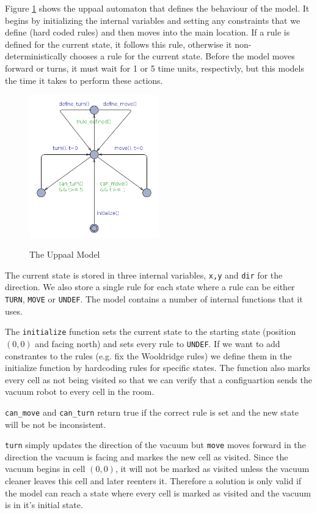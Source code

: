 \documentclass{article}
\begin{document}
    Figure \ref{fig:model} shows the uppaal automaton that defines the behaviour of the model. It begins by initializing the internal variables and setting any constraints that we define (hard coded rules) and then moves into the main location. If a rule is defined for the current state, it follows this rule, otherwise it non-deterministically chooses a rule for the current state. Before the model moves forward or turns, it must wait for 1 or 5 time units, respectivly, but this models the time it takes to perform these actions.

    \begin{figure}[h!]
        \caption{The Uppaal Model}
        \centering
        \includegraphics[width=0.5\textwidth]{model.png}
        \label{fig:model}
    \end{figure}

    The current state is stored in three internal variables, \texttt{x,y} and \texttt{dir} for the direction. We also store a single rule for each state where a rule can be either \texttt{TURN}, \texttt{MOVE} or \texttt{UNDEF}. The model contains a number of internal functions that it uses.
    
    The \texttt{initialize} function sets the current state to the starting state (position $(0,0)$ and facing north) and sets every rule to \texttt{UNDEF}. If we want to add constrantes to the rules (e.g. fix the  Wooldridge rules) we define them in the initialize function by hardcoding rules for specific states. The function also marks every cell as not being visited so that we can verify that a configuartion sends the vacuum robot to every cell in the room.

    \texttt{can\_move} and \texttt{can\_turn} return true if the correct rule is set and the new state will be not be inconsistent.

    \texttt{turn} simply updates the direction of the vacuum but \texttt{move} moves forward in the direction the vacuum is facing and markes the new cell as visited. Since the vacuum begins in cell $(0,0)$, it will not be marked as visited unless the vacuum cleaner leaves this cell and later reenters it. Therefore a solution is only valid if the model can reach a state where every cell is marked as visited and the vacuum is in it's initial state.
\end{document}
